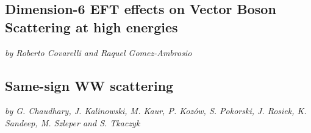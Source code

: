 \documentclass[../report.tex]{subfiles}
\providecommand{\main}{..}
\begin{document}
\subsection{Dimension-6 EFT effects on Vector Boson Scattering at high energies}\label{sec:VBFdim6eft}

\begin{center}
{\it by Roberto Covarelli and  Raquel Gomez-Ambrosio}
\end{center}



\newpage

\subsection{ Same-sign WW scattering}\label{sect-ssWW}
\begin{center}
 {\it by G. Chaudhary, 
 J. Kalinowski,
 M. Kaur, 
P. Koz{\'o}w, S. Pokorski,
J. Rosiek, 
K. Sandeep, 
M. Szleper 
and
S. Tkaczyk
}
\end{center}


\end{document}
